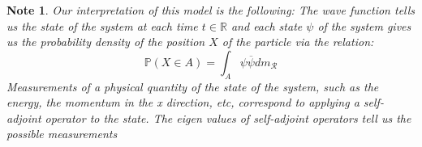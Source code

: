 \documentclass[12pt]{amsart}
\newtheorem{note}[thm]{Note}
\newcommand{\R}{\mathbb{R}}
\renewcommand{\P}{\mathbb{P}}
\renewcommand{\MR}{\mathcal{R}}
\begin{document}
\begin{note}
Our interpretation of this model is the following: The wave function tells us the state of the system at each time $t \in \R$ and each state $\psi$ of the system gives us the probability density of the position $X$ of the particle via the relation: $$\P(X \in A) = \int_{A} \psi \overline{\psi} dm_{\MR}$$  Measurements of a physical quantity of the state of the system, such as the energy, the momentum in the x direction, etc, correspond to applying a self-adjoint operator to the state. The eigen values of self-adjoint operators tell us the possible measurements 
\end{note}
\end{document}
